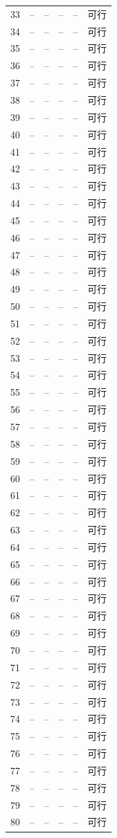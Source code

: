 \begin{longtable}{cccccc}
33&--&--&--&--&可行\\
34&--&--&--&--&可行\\
35&--&--&--&--&可行\\
36&--&--&--&--&可行\\
37&--&--&--&--&可行\\
38&--&--&--&--&可行\\
39&--&--&--&--&可行\\
40&--&--&--&--&可行\\
41&--&--&--&--&可行\\
42&--&--&--&--&可行\\
43&--&--&--&--&可行\\
44&--&--&--&--&可行\\
45&--&--&--&--&可行\\
46&--&--&--&--&可行\\
47&--&--&--&--&可行\\
48&--&--&--&--&可行\\
49&--&--&--&--&可行\\
50&--&--&--&--&可行\\
51&--&--&--&--&可行\\
52&--&--&--&--&可行\\
53&--&--&--&--&可行\\
54&--&--&--&--&可行\\
55&--&--&--&--&可行\\
56&--&--&--&--&可行\\
57&--&--&--&--&可行\\
58&--&--&--&--&可行\\
59&--&--&--&--&可行\\
60&--&--&--&--&可行\\
61&--&--&--&--&可行\\
62&--&--&--&--&可行\\
63&--&--&--&--&可行\\
64&--&--&--&--&可行\\
65&--&--&--&--&可行\\
66&--&--&--&--&可行\\
67&--&--&--&--&可行\\
68&--&--&--&--&可行\\
69&--&--&--&--&可行\\
70&--&--&--&--&可行\\
71&--&--&--&--&可行\\
72&--&--&--&--&可行\\
73&--&--&--&--&可行\\
74&--&--&--&--&可行\\
75&--&--&--&--&可行\\
76&--&--&--&--&可行\\
77&--&--&--&--&可行\\
78&--&--&--&--&可行\\
79&--&--&--&--&可行\\
80&--&--&--&--&可行\\
\bottomrule
\end{longtable}
\normalsize
